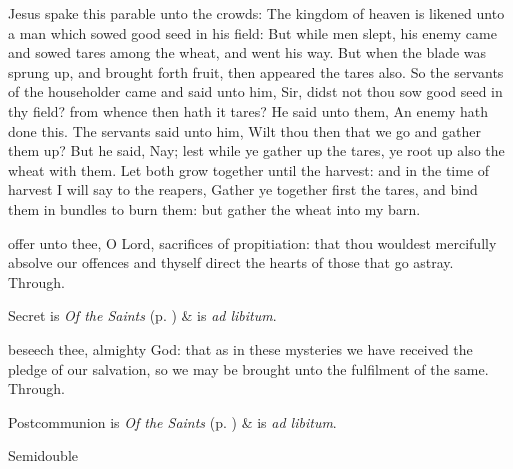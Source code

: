 

 Jesus spake this parable unto the crowds: The kingdom of heaven is likened unto a man which sowed good seed in his field: But while men slept, his enemy came and sowed tares among the wheat, and went his way. But when the blade was sprung up, and brought forth fruit, then appeared the tares also. So the servants of the householder came and said unto him, Sir, didst not thou sow good seed in thy field? from whence then hath it tares? He said unto them, An enemy hath done this. The servants said unto him, Wilt thou then that we go and gather them up? But he said, Nay; lest while ye gather up the tares, ye root up also the wheat with them. Let both grow together until the harvest: and in the time of harvest I will say to the reapers, Gather ye together first the tares, and bind them in bundles to burn them: but gather the wheat into my barn.

\secret\label{EpiphanyVSecret}
 offer unto thee, O Lord, sacrifices of propitiation: that thou wouldest mercifully absolve our offences and thyself direct the hearts of those that go astray. Through.
\begin{rubric}
     Secret is \emph{Of the Saints} (p. \pageref{SPSaints}) \&  is \emph{ad libitum}.
\end{rubric}
\postcommunion\label{EpiphanyVPostcommunion}
 beseech thee, almighty God: that as in these mysteries we have received the pledge of our salvation, so we may be brought unto the fulfilment of the same. Through.
\begin{rubric}
     Postcommunion is \emph{Of the Saints} (p. \pageref{SPSaints}) \&  is \emph{ad libitum}.
\end{rubric}


\begin{inhead}
{Semidouble}
\end{inhead}
\par\noindent
{}

